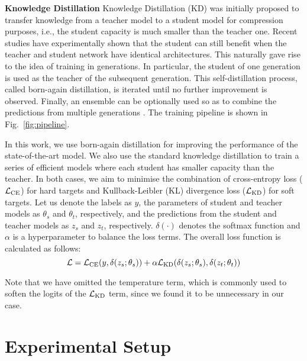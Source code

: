 \documentclass{article}
\begin{document}
\noindent\textbf{Knowledge Distillation}\quad
Knowledge Distillation (KD) \cite{hinton2014distilling} was initially proposed to transfer knowledge from a teacher model to a student model for compression purposes, i.e., the student capacity is much smaller than the teacher one. Recent studies \cite{furlanello2018born, bagherinezhad2018label, yang2018knowledge} have experimentally shown that the student can still benefit when the teacher and student network have identical architectures. This naturally gave rise to the idea of training in generations. In particular, the student of one generation is used as the teacher of the subsequent generation. This self-distillation process, called born-again distillation, is iterated until no further improvement is observed. Finally, an ensemble can be optionally used so as to combine the predictions from multiple generations \cite{furlanello2018born}. The training pipeline is shown in Fig.~\ref{fig:pipeline}. 


In this work, we use born-again distillation for improving the performance of the state-of-the-art model. We also use the standard knowledge distillation to train a series of efficient models where each student has smaller capacity than the teacher. In both cases, we aim to minimise the combination of cross-entropy loss ($\mathcal{L}_{{\rm CE}}$) for hard targets and Kullback-Leibler (KL) divergence loss ($\mathcal{L}_{{\rm KD}}$) for soft targets. Let us denote the labels as $y$, the parameters of student and teacher models as $\theta_s$ and $\theta_t$, respectively, and the predictions from the student and teacher models as $z_s$ and $z_t$, respectively. $\delta(\cdot)$ denotes the softmax function and $\alpha$ is a hyperparameter to balance the loss terms. The overall loss function is calculated as follows:
\begin{equation}
\mathcal{L} = \mathcal{L}_{{\rm CE}}(y, \delta(z_s;\theta_s)) + \alpha \mathcal{L}_{{\rm KD}}(\delta(z_s;\theta_s), \delta(z_t;\theta_t))
\label{eq:KD_loss}
\end{equation}

Note that we have omitted the temperature term, which is commonly used to soften the logits of the $\mathcal{L}_{{\rm KD}}$ term, since we found it to be unnecessary in our case.




\section{Experimental Setup}
\end{document}
